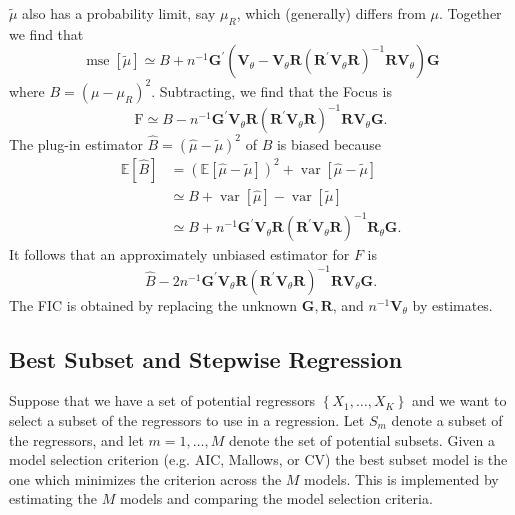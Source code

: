\documentclass[10pt]{article}
\begin{document}
$\widetilde{\mu}$ also has a probability limit, say $\mu_{R}$, which (generally) differs from $\mu$. Together we find that
$$
\operatorname{mse}[\widetilde{\mu}] \simeq B+n^{-1} \boldsymbol{G}^{\prime}\left(\boldsymbol{V}_{\theta}-\boldsymbol{V}_{\theta} \boldsymbol{R}\left(\boldsymbol{R}^{\prime} \boldsymbol{V}_{\theta} \boldsymbol{R}\right)^{-1} \boldsymbol{R} \boldsymbol{V}_{\theta}\right) \boldsymbol{G}
$$
where $B=\left(\mu-\mu_{R}\right)^{2}$. Subtracting, we find that the Focus is
$$
\mathrm{F} \simeq B-n^{-1} \boldsymbol{G}^{\prime} \boldsymbol{V}_{\theta} \boldsymbol{R}\left(\boldsymbol{R}^{\prime} \boldsymbol{V}_{\theta} \boldsymbol{R}\right)^{-1} \boldsymbol{R} \boldsymbol{V}_{\theta} \boldsymbol{G} .
$$
The plug-in estimator $\widehat{B}=(\widehat{\mu}-\widetilde{\mu})^{2}$ of $B$ is biased because
$$
\begin{aligned}
\mathbb{E}[\widehat{B}] &=(\mathbb{E}[\widehat{\mu}-\widetilde{\mu}])^{2}+\operatorname{var}[\widehat{\mu}-\widetilde{\mu}] \\
& \simeq B+\operatorname{var}[\widehat{\mu}]-\operatorname{var}[\widetilde{\mu}] \\
& \simeq B+n^{-1} \boldsymbol{G}^{\prime} \boldsymbol{V}_{\theta} \boldsymbol{R}\left(\boldsymbol{R}^{\prime} \boldsymbol{V}_{\theta} \boldsymbol{R}\right)^{-1} \boldsymbol{R}_{\theta} \boldsymbol{G} .
\end{aligned}
$$
It follows that an approximately unbiased estimator for $F$ is
$$
\widehat{B}-2 n^{-1} \boldsymbol{G}^{\prime} \boldsymbol{V}_{\theta} \boldsymbol{R}\left(\boldsymbol{R}^{\prime} \boldsymbol{V}_{\theta} \boldsymbol{R}\right)^{-1} \boldsymbol{R} \boldsymbol{V}_{\theta} \boldsymbol{G} .
$$
The FIC is obtained by replacing the unknown $\boldsymbol{G}, \boldsymbol{R}$, and $n^{-1} \boldsymbol{V}_{\theta}$ by estimates.

\subsection{Best Subset and Stepwise Regression}
Suppose that we have a set of potential regressors $\left\{X_{1}, \ldots, X_{K}\right\}$ and we want to select a subset of the regressors to use in a regression. Let $S_{m}$ denote a subset of the regressors, and let $m=1, \ldots, M$ denote the set of potential subsets. Given a model selection criterion (e.g. AIC, Mallows, or CV) the best subset model is the one which minimizes the criterion across the $M$ models. This is implemented by estimating the $M$ models and comparing the model selection criteria.
\end{document}
